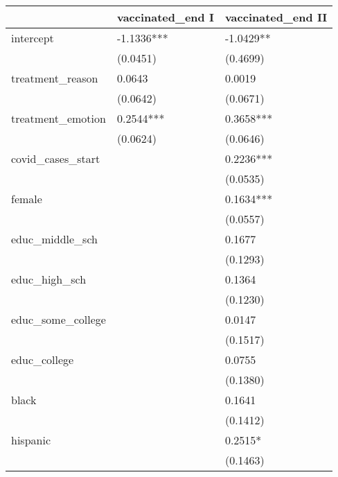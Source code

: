 \begin{table}
\caption{}
\label{}
\begin{center}
\begin{tabular}{lll}
\hline
                    & vaccinated\_end I & vaccinated\_end II  \\
\hline
intercept           & -1.1336***        & -1.0429**           \\
                    & (0.0451)          & (0.4699)            \\
treatment\_reason   & 0.0643            & 0.0019              \\
                    & (0.0642)          & (0.0671)            \\
treatment\_emotion  & 0.2544***         & 0.3658***           \\
                    & (0.0624)          & (0.0646)            \\
covid\_cases\_start &                   & 0.2236***           \\
                    &                   & (0.0535)            \\
female              &                   & 0.1634***           \\
                    &                   & (0.0557)            \\
educ\_middle\_sch   &                   & 0.1677              \\
                    &                   & (0.1293)            \\
educ\_high\_sch     &                   & 0.1364              \\
                    &                   & (0.1230)            \\
educ\_some\_college &                   & 0.0147              \\
                    &                   & (0.1517)            \\
educ\_college       &                   & 0.0755              \\
                    &                   & (0.1380)            \\
black               &                   & 0.1641              \\
                    &                   & (0.1412)            \\
hispanic            &                   & 0.2515*             \\
                    &                   & (0.1463)            \\

\end{tabular}
\end{center}
\end{table}
